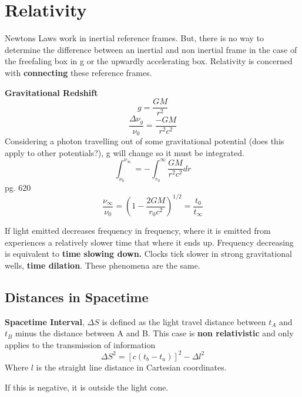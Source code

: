 \section{Relativity}
Newtons Laws work in inertial reference frames. But, there is no way to determine the difference between an inertial and non inertial frame in the case of the freefaling box in g or the upwardly accelerating box. Relativity is concerned with \textbf{connecting} these reference frames.

\textbf{Gravitational Redshift}
\begin{equation}
	\label{}
	g=\frac{GM}{r^{2}}
\end{equation}
\begin{equation}
	\label{}
	\frac{\Delta\nu_{g}}{\nu_{0}}=\frac{-GM}{r^{2}c^{2}}
\end{equation}
Considering a photon travelling out of some gravitational potential (does this apply to other potentials?), g will change so it must be integrated.
\begin{equation}
	\label{}
	\int_{\nu_{0}}^{\nu_{\infty}}=-\int_{r_{0}}^{\infty}\frac{GM}{r^{2}c^{2}}dr
\end{equation}
pg. 620
\begin{equation}
	\label{}
	\frac{\nu_{\infty}}{\nu_{0}}=(1-\frac{2GM}{r_{0}c^{2}})^{1/2}=\frac{t_{0}}{t_{\infty}}
\end{equation}

If light emitted decreases frequency in frequency, where it is emitted from experiences a relatively slower time that where it ends up. 
Frequency decreasing is equivalent to \textbf{time slowing down.} Clocks tick slower in strong gravitational wells, \textbf{time dilation}. These phenomena are the same.

\subsection{Distances in Spacetime}

\textbf{Spacetime Interval}, $\Delta S$ is defined as the light travel distance between $t_{A}$ and $t_{B}$ minus the distance between A and B. This case is \textbf{non relativistic} and only applies to the transmission of information
\begin{equation}
	\label{}
	\Delta S^{2}=[c(t_{b}-t_{a})]^{2}-\Delta l^{2}
\end{equation}
Where $l$ is the straight line distance in Cartesian coordinates. 

If this is negative, it is outside the light cone. 

